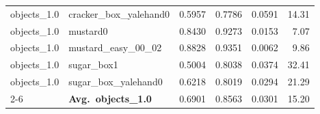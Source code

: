 \begin{longtable}{llrrrr}
  objects_1.0 & cracker\_box\_yalehand0 & 0.5957 & 0.7786 & 0.0591 & 14.31 \\
  objects_1.0 & mustard0 & 0.8430 & 0.9273 & 0.0153 & 7.07 \\
  objects_1.0 & mustard\_easy\_00\_02 & 0.8828 & 0.9351 & 0.0062 & 9.86 \\
  objects_1.0 & sugar\_box1 & 0.5004 & 0.8038 & 0.0374 & 32.41 \\
  objects_1.0 & sugar\_box\_yalehand0 & 0.6218 & 0.8019 & 0.0294 & 21.29 \\
  \cmidrule{2-6}
  & \textbf{Avg.~objects_1.0} & 0.6901 & 0.8563 & 0.0301 & 15.20 \\
  \midrule
\bottomrule
\end{longtable}